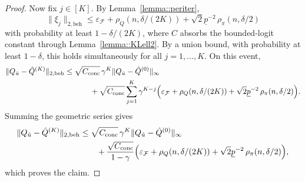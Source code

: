 \documentclass{article}
\newcommand{\1}{\mathbbm{1}}
\begin{document}
\begin{proof}
Now fix \(j\in[K]\). By Lemma~\ref{lemma::periter},
\[
\|\xi_j\|_{2,\mathrm{beh}}
\le
\varepsilon_{\mathcal F}
+\rho_Q(n,\delta/(2K))
+\sqrt{2}\underline p^{-2}\,\rho_\pi(n,\delta/2)
\]
with probability at least \(1-\delta/(2K)\), where \(C\) absorbs the
bounded-logit constant through Lemma~\ref{lemma::KLell2}. By a union bound,
with probability at least \(1-\delta\), this holds simultaneously for all
\(j=1,\dots,K\). On this event,
\begin{align*}
\|Q_{\hat u}-\hat Q^{(K)}\|_{2,\mathrm{beh}}
\le\;&
\sqrt{C_{\mathrm{conc}}}\,\gamma^K
\|Q_{\hat u}-\hat Q^{(0)}\|_\infty
\\
&\qquad+
\sqrt{C_{\mathrm{conc}}}
\sum_{j=1}^K \gamma^{K-j}
\Bigl(
\varepsilon_{\mathcal F}
+\rho_Q(n,\delta/(2K))
+\sqrt{2}\underline p^{-2}\,\rho_\pi(n,\delta/2)
\Bigr).
\end{align*}
Summing the geometric series gives
\begin{align*}
\|Q_{\hat u}-\hat Q^{(K)}\|_{2,\mathrm{beh}}
&\le
\sqrt{C_{\mathrm{conc}}}\,\gamma^K
\|Q_{\hat u}-\hat Q^{(0)}\|_\infty
\\
&\qquad+
\frac{\sqrt{C_{\mathrm{conc}}}}{1-\gamma}
\Bigl(
\varepsilon_{\mathcal F}
+\rho_Q(n,\delta/(2K))
+\sqrt{2}\underline p^{-2}\,\rho_\pi(n,\delta/2)
\Bigr),
\end{align*}
which proves the claim.
\end{proof}
 
\end{document}
